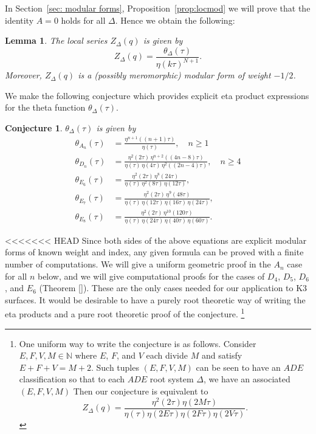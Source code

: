 \documentclass{article}
\newtheorem{conjecture}[theorem]{Conjecture}
\newtheorem{lemma}[theorem]{Lemma}
\theoremstyle{definition}
\newcommand{\NN} {{\mathbb N}}		%
\begin{document}
In Section~\ref{sec: modular forms}, Proposition~\ref{prop:locmod} we will prove that the identity $A=0$ holds
for all $\Delta$. Hence we obtain the following:
\begin{lemma}\label{lem: local series as theta/eta} The local series
$Z_{\Delta}(q)$ is given by
\[
Z_{\Delta}(q) = \frac{\theta_{\Delta}(\tau )}{\eta (k\tau )^{N+1}}. 
\]
Moreover, $Z_{\Delta}(q)$  is a (possibly meromorphic) modular form of weight $-1/2$.
\end{lemma}
We make the following conjecture which provides explicit eta product expressions for the theta function $\theta_{\Delta}(\tau )$.

\begin{conjecture}\label{conj: eta product for theta function}
$\theta_{\Delta}(\tau )$ is given by
\begin{align}\label{eqn: theta function eta products}
\theta_{A_{n}}(\tau ) &= \frac{\eta^{n+1}((n+1)\tau )}{\eta (\tau )} ,\quad n\geq 1\\
\theta_{D_{n}}(\tau ) &= \frac{\eta^{2}(2\tau )\,  \eta^{n+2}((4n-8)\tau )}{\eta (\tau )\,  \eta (4\tau )\,  \eta^{2}((2n-4)\tau )} ,\quad n\geq 4\\
\theta_{E_{6}}(\tau ) & = \frac{\eta^{2}(2\tau )\, \eta^{8}(24\tau
)}{\eta (\tau )\, \eta^{2}(8\tau )\, \eta (12\tau )} ,\\
\theta_{E_{7}}(\tau ) & = \frac{\eta^{2}(2\tau )\, \eta^{9}(48\tau
)}{\eta (\tau )\, \eta(12\tau )\, \eta(16\tau )\, \eta (24\tau )} ,\\
\theta_{E_{8}}(\tau ) & = \frac{\eta^{2}(2\tau )\, \eta^{10}(120\tau
)}{\eta (\tau )\, \eta(24\tau )\, \eta(40\tau )\, \eta (60\tau )}.
\end{align}
\end{conjecture}

<<<<<<< HEAD
Since both sides of the above equations are explicit modular forms of
known weight and index, any given formula can be proved with a finite
number of computations. We will give a uniform geometric proof in the
$A_{n}$ case for all $n$ below, and we will give computational proofs
for the cases of $D_{4}$, $D_{5}$, $D_{6}$, and $E_{6}$ (Theorem
\ref{}). These are the only cases needed for our application to K3
surfaces. It would be desirable to have a purely root theoretic way of
writing the eta products and a pure root theoretic proof of the
conjecture. \footnote{One uniform way to write the conjecture is as
follows. Consider $E,F,V,M\in \NN$ where $E$, $F$, and $V$ each divide
$M$ and satisfy $E+F+V =M+2$. Such tuples $(E,F,V,M)$ can be seen to
have an $ADE$ classification so that to each $ADE$ root system
$\Delta$, we have an associated $(E,F,V,M)$ Then our conjecture is
equivalent to
\[
Z_{\Delta}(q) = \frac{\eta^{2}(2\tau )\eta (2M\tau )}{\eta (\tau )\eta
(2E\tau )\eta (2F\tau )\eta (2V\tau )}. 
\]   }
\end{document}
